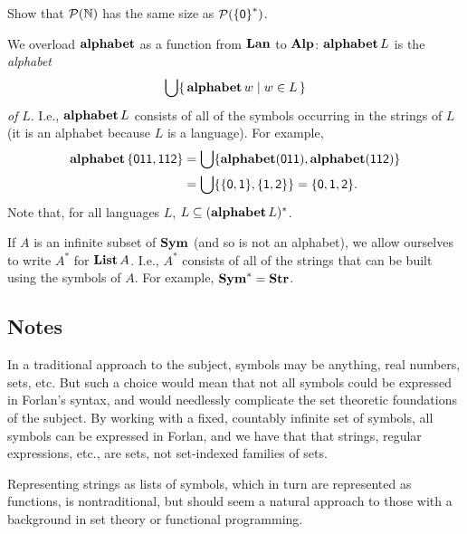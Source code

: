 \begin{exercise}
Show that ${\cal P} (\mathbb{N})$ has the same size as  ${\cal P} (\mathsf{\{0\}}^*)$.
\end{exercise}

We overload $\mathbf{alphabet}$ as a function from $\mathbf{Lan}$ to $\mathbf{Alp}$:
$\mathbf{alphabet}\,L$ is
%
%
the \emph{alphabet}
%
%
\begin{gather*}
\bigcup\{ \, \mathbf{alphabet}\,w \mid w\in L \, \}
\end{gather*}
\emph{of} $L$.
I.e., $\mathbf{alphabet}\,L$ consists of all of the symbols occurring in the
strings of $L$ (it is an alphabet because $L$ is a language).
For example,
\begin{align*}
\mathbf{alphabet}\,\mathsf{\{011,112\}} &=
\bigcup\{\mathbf{alphabet}(\mathsf{011}),\mathbf{alphabet}(\mathsf{112})\} \\
&= \bigcup\{\{\mathsf{0},\mathsf{1}\},\{\mathsf{1},\mathsf{2}\}\}
= \{\mathsf{0},\mathsf{1},\mathsf{2}\} .
\end{align*}
Note that, for all languages $L$, $L\subseteq(\mathbf{alphabet}\,L)^*$.

If $A$ is an infinite subset of $\mathbf{Sym}$ (and so is not an alphabet), we
allow ourselves to write $A^*$
%
for $\mathbf{List}\,A$.
I.e., $A^*$ consists of all of the strings that can be built using the
symbols of $A$.  For example, $\mathbf{Sym}^* = \mathbf{Str}$.
%
%
%

\subsection{Notes}

In a traditional approach to the subject, symbols may be anything,
real numbers, sets, etc.  But such a choice would mean that not all
symbols could be expressed in Forlan's syntax, and would needlessly
complicate the set theoretic foundations of the subject.  By working
with a fixed, countably infinite set of symbols, all symbols can be
expressed in Forlan, and we have that that strings, regular
expressions, etc., are sets, not set-indexed families of sets.

Representing strings as lists of symbols, which in turn are
represented as functions, is nontraditional, but should seem a natural
approach to those with a background in set theory or functional
programming.

